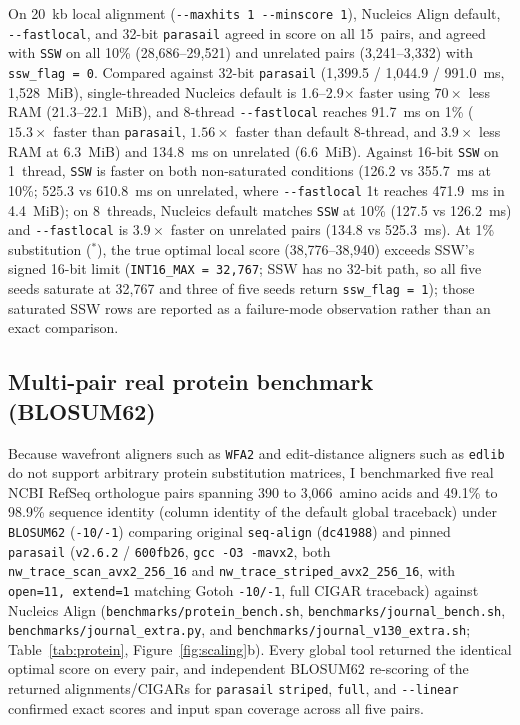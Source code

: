 \documentclass[11pt,a4paper]{article}
\begin{document}
On 20~kb local alignment (\texttt{-{}-maxhits 1 -{}-minscore 1}), Nucleics Align default, \texttt{-{}-fastlocal}, and 32-bit \texttt{parasail} agreed in score on all 15~pairs, and agreed with \texttt{SSW} on all 10\% (28,686--29,521) and unrelated pairs (3,241--3,332) with \texttt{ssw\_flag = 0}. Compared against 32-bit \texttt{parasail} (1,399.5 / 1,044.9 / 991.0~ms, 1,528~MiB), single-threaded Nucleics default is 1.6--2.9$\times$ faster using $70\times$ less RAM (21.3--22.1~MiB), and 8-thread \texttt{-{}-fastlocal} reaches 91.7~ms on 1\% ($15.3\times$ faster than \texttt{parasail}, $1.56\times$ faster than default 8-thread, and $3.9\times$ less RAM at 6.3~MiB) and 134.8~ms on unrelated (6.6~MiB). Against 16-bit \texttt{SSW} on 1~thread, \texttt{SSW} is faster on both non-saturated conditions (126.2 vs 355.7~ms at 10\%; 525.3 vs 610.8~ms on unrelated, where \texttt{-{}-fastlocal} 1t reaches 471.9~ms in 4.4~MiB); on 8~threads, Nucleics default matches \texttt{SSW} at 10\% (127.5 vs 126.2~ms) and \texttt{-{}-fastlocal} is $3.9\times$ faster on unrelated pairs (134.8 vs 525.3~ms). At 1\% substitution ($^{*}$), the true optimal local score (38,776--38,940) exceeds SSW's signed 16-bit limit (\texttt{INT16\_MAX = 32,767}; SSW has no 32-bit path, so all five seeds saturate at 32,767 and three of five seeds return \texttt{ssw\_flag = 1}); those saturated SSW rows are reported as a failure-mode observation rather than an exact comparison.

\subsection{Multi-pair real protein benchmark (BLOSUM62)}

Because wavefront aligners such as \texttt{WFA2} and edit-distance aligners such as \texttt{edlib} do not support arbitrary protein substitution matrices, I benchmarked five real NCBI RefSeq orthologue pairs spanning 390 to 3,066~amino acids and 49.1\% to 98.9\% sequence identity (column identity of the default global traceback) under \texttt{BLOSUM62} (\texttt{-10/-1}) comparing original \texttt{seq-align} (\texttt{dc41988}) and pinned \texttt{parasail} (\texttt{v2.6.2} / \texttt{600fb26}, \texttt{gcc -O3 -mavx2}, both \texttt{nw\_trace\_scan\_avx2\_256\_16} and \texttt{nw\_trace\_striped\_avx2\_256\_16}, with \texttt{open=11, extend=1} matching Gotoh \texttt{-10/-1}, full CIGAR traceback) \citep{daily2016parasail} against Nucleics Align (\texttt{benchmarks/protein\_bench.sh}, \texttt{benchmarks/journal\_bench.sh}, \texttt{benchmarks/journal\_extra.py}, and \texttt{benchmarks/journal\_v130\_extra.sh}; Table~\ref{tab:protein}, Figure~\ref{fig:scaling}b). Every global tool returned the identical optimal score on every pair, and independent BLOSUM62 re-scoring of the returned alignments/CIGARs for \texttt{parasail} \texttt{striped}, \texttt{full}, and \texttt{-{}-linear} confirmed exact scores and input span coverage across all five pairs.
\end{document}
